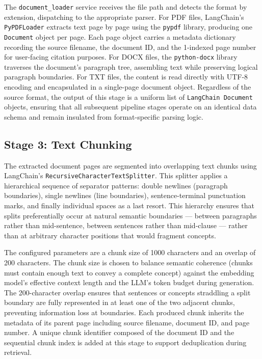 The \texttt{document\_loader} service receives the file path and detects the format by extension, dispatching to the appropriate parser. For PDF files, LangChain's \texttt{PyPDFLoader} extracts text page by page using the \texttt{pypdf} library, producing one \texttt{Document} object per page. Each page object carries a metadata dictionary recording the source filename, the document ID, and the 1-indexed page number for user-facing citation purposes. For DOCX files, the \texttt{python-docx} library traverses the document's paragraph tree, assembling text while preserving logical paragraph boundaries. For TXT files, the content is read directly with UTF-8 encoding and encapsulated in a single-page document object. Regardless of the source format, the output of this stage is a uniform list of \texttt{LangChain Document} objects, ensuring that all subsequent pipeline stages operate on an identical data schema and remain insulated from format-specific parsing logic.

\subsection{Stage 3: Text Chunking}

The extracted document pages are segmented into overlapping text chunks using LangChain's \texttt{RecursiveCharacterTextSplitter}. This splitter applies a hierarchical sequence of separator patterns: double newlines (paragraph boundaries), single newlines (line boundaries), sentence-terminal punctuation marks, and finally individual spaces as a last resort. This hierarchy ensures that splits preferentially occur at natural semantic boundaries --- between paragraphs rather than mid-sentence, between sentences rather than mid-clause --- rather than at arbitrary character positions that would fragment concepts.

The configured parameters are a chunk size of 1000 characters and an overlap of 200 characters. The chunk size is chosen to balance semantic coherence (chunks must contain enough text to convey a complete concept) against the embedding model's effective context length and the LLM's token budget during generation. The 200-character overlap ensures that sentences or concepts straddling a split boundary are fully represented in at least one of the two adjacent chunks, preventing information loss at boundaries. Each produced chunk inherits the metadata of its parent page including source filename, document ID, and page number. A unique chunk identifier composed of the document ID and the sequential chunk index is added at this stage to support deduplication during retrieval.

